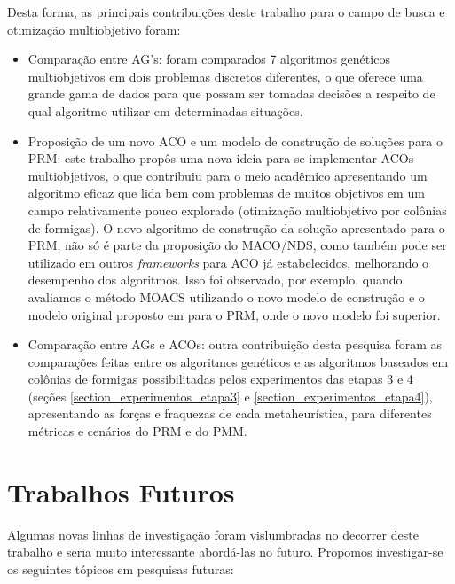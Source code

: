 Desta forma, as principais contribuições deste trabalho para o campo de busca e otimização multiobjetivo foram:

\begin{itemize}
	\item Comparação entre AG's: foram comparados 7 algoritmos genéticos multiobjetivos em dois problemas discretos diferentes, o que oferece uma grande gama de dados para que possam ser tomadas decisões a respeito de qual algoritmo utilizar em determinadas situações.
	\item Proposição de um novo ACO e um modelo de construção de soluções para o PRM: este trabalho propôs uma nova ideia para se implementar ACOs multiobjetivos, o que contribuiu para o meio acadêmico apresentando um algoritmo eficaz que lida bem com problemas de muitos objetivos em um campo relativamente pouco explorado (otimização multiobjetivo por colônias de formigas). O novo algoritmo de construção da solução apresentado para o PRM, não só é parte da proposição do MACO/NDS, como também pode ser utilizado em outros \textit{frameworks} para ACO já estabelecidos, melhorando o desempenho dos algoritmos. Isso foi observado, por exemplo, quando avaliamos o método MOACS utilizando o novo modelo de construção e o modelo original proposto em \cite{Riveros2016} para o PRM, onde o novo modelo foi superior.
	\item Comparação entre AGs e ACOs: outra contribuição desta pesquisa foram as comparações feitas entre os algoritmos genéticos e as algoritmos baseados em colônias de formigas possibilitadas pelos experimentos das etapas 3 e 4 (seções \ref{section_experimentos_etapa3} e \ref{section_experimentos_etapa4}), apresentando as forças e fraquezas de cada metaheurística, para diferentes métricas e cenários do PRM e do PMM.
\end{itemize}

\section{Trabalhos Futuros}
Algumas novas linhas de investigação foram vislumbradas no decorrer deste trabalho e seria muito interessante abordá-las no futuro. Propomos investigar-se os seguintes tópicos em pesquisas futuras:

